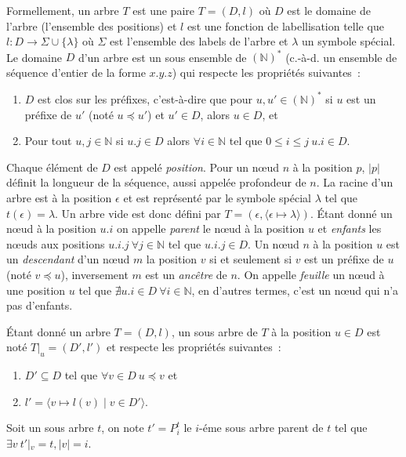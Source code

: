 \begin{definition}
    Formellement, un arbre $T$ est une paire $T = (D, l)$ où $D$ est le domaine de l'arbre (l'ensemble des positions) et $l$ est une fonction de labellisation telle que $l : D \to \Sigma \cup \{\lambda\}$ où $\Sigma$ est l'ensemble des labels de l'arbre et $\lambda$ un symbole spécial.
    Le domaine $D$ d'un arbre est un sous ensemble de $(\mathbb{N})^*$ (c.-à-d. un ensemble de séquence d'entier de la forme $x.y.z$) qui respecte les propriétés suivantes :
    \begin{enumerate}
        \item $D$ est clos sur les préfixes, c'est-à-dire que pour $u, u' \in (\mathbb{N})^*$ si $u$ est un préfixe de $u'$ (noté $u \preceq u'$) et $u' \in D$, alors $u \in D$, et
        \item Pour tout $u, j \in \mathbb{N}$ si $u.j \in D$ alors $\forall i \in \mathbb{N}$ tel que $0 \leq i \leq j ~ u.i \in D$.
    \end{enumerate}
    Chaque élément de $D$ est appelé \emph{position}.
    Pour un nœud $n$ à la position $p$, $|p|$ définit la longueur de la séquence, aussi appelée profondeur de $n$.
    La racine d'un arbre est à la position $\epsilon$ et est représenté par le symbole spécial $\lambda$ tel que $t(\epsilon) = \lambda$.
    Un arbre vide est donc défini par  $T = (\epsilon, \langle \epsilon \mapsto \lambda \rangle)$.
    Étant donné un nœud à la position $u.i$ on appelle \emph{parent} le nœud à la position $u$ et \emph {enfants} les nœuds aux positions $u.i.j ~ \forall j \in \mathbb{N}$ tel que $u.i.j \in D$.
    Un nœud $n$ à la position $u$ est un \emph{descendant} d'un nœud $m$ la position $v$ si et seulement si $v$ est un préfixe de $u$ (noté $v \preceq u$), inversement $m$ est un \emph{ancêtre} de $n$.
    On appelle \emph{feuille} un nœud à une position $u$ tel que $\nexists u.i \in D ~ \forall i \in \mathbb{N}$, en d'autres termes, c'est un nœud qui n'a pas d'enfants.
\end{definition}

\begin{definition}
    Étant donné un arbre $T = (D, l)$, un sous arbre de $T$ à la position $u \in D$ est noté $T|_u = (D', l')$ et respecte les propriétés suivantes :
    \begin{enumerate}
        \item $D' \subseteq D$ tel que $\forall v \in D ~ u \preceq v$ et
        \item $l' = \langle v \mapsto l(v) \mid v \in D' \rangle $.
    \end{enumerate}
    Soit un sous arbre $t$, on note $t' = P_i^t$ le $i$-éme sous arbre parent de $t$ tel que $\exists v ~ t'|_v = t, |v| = i$.
\end{definition}

